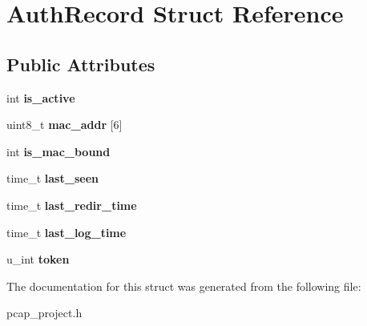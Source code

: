 \hypertarget{structAuthRecord}{}\section{Auth\+Record Struct Reference}
\label{structAuthRecord}
\subsection*{Public Attributes}
\begin{DoxyCompactItemize}
\item 
\mbox{\label{structAuthRecord_a783d6f0781f0f3377909c429dc6d417d}} 
int {\bfseries is\+\_\+active}
\item 
\mbox{\label{structAuthRecord_acccb3c8db38e94380d3d465ef1719db0}} 
uint8\+\_\+t {\bfseries mac\+\_\+addr} \mbox{[}6\mbox{]}
\item 
\mbox{\label{structAuthRecord_a150d18b16bef754e7ac86a94df8f66ac}} 
int {\bfseries is\+\_\+mac\+\_\+bound}
\item 
\mbox{\label{structAuthRecord_a1adcd37bb8cae7b60d5b4977cef35be1}} 
time\+\_\+t {\bfseries last\+\_\+seen}
\item 
\mbox{\label{structAuthRecord_a063de21054ad851caaddf396092afb72}} 
time\+\_\+t {\bfseries last\+\_\+redir\+\_\+time}
\item 
\mbox{\label{structAuthRecord_af7f5b41ae115464d9d99b1e37789dac2}} 
time\+\_\+t {\bfseries last\+\_\+log\+\_\+time}
\item 
\mbox{\label{structAuthRecord_a46e51db14429106eb24c0f66a2a5f5ee}} 
u\+\_\+int {\bfseries token}
\end{DoxyCompactItemize}


The documentation for this struct was generated from the following file\+:\begin{DoxyCompactItemize}
\item 
pcap\+\_\+project.\+h\end{DoxyCompactItemize}
